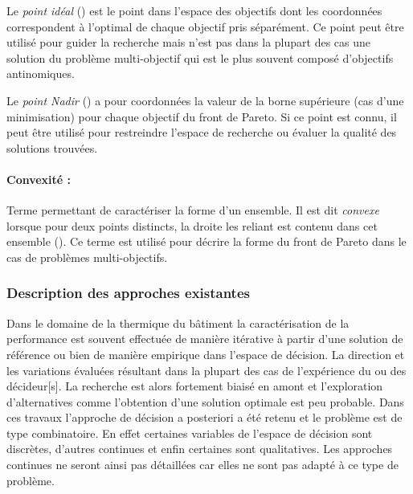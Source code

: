 Le \emph{point idéal} () est le point dans l’espace des objectifs dont
les coordonnées correspondent à l’optimal de chaque objectif pris séparément. Ce point
peut être utilisé pour guider la recherche mais n’est pas dans la plupart des cas
une solution du problème multi-objectif qui est le plus souvent composé d’objectifs
antinomiques.

Le \emph{point Nadir} () a pour coordonnées la
valeur de la borne supérieure (cas d’une minimisation) pour chaque objectif du front
de Pareto. Si ce point est connu, il peut être utilisé pour restreindre l’espace
de recherche ou évaluer la qualité des solutions trouvées.

\paragraph{Convexité :} %
\label{par:convexite}
Terme permettant de caractériser la forme d’un ensemble.
Il est dit \emph{convexe} lorsque pour deux points distincts, la droite les reliant
est contenu dans cet ensemble (\cite{Collette2002}). Ce terme est utilisé pour décrire
la forme du front de Pareto dans le cas de problèmes multi-objectifs.

\subsubsection{Description des approches existantes} %
\label{ssub:description_des_approches_existantes}
Dans le domaine de la thermique du bâtiment la caractérisation
de la performance est souvent effectuée de manière itérative à partir d’une solution
de référence ou bien de manière empirique dans l’espace de décision. La direction et
les variations évaluées résultant dans la plupart des cas de l’expérience du ou des
décideur[s]. La recherche est alors fortement biaisé en amont et l’exploration
d’alternatives comme l’obtention d’une solution optimale est peu probable.
Dans ces travaux l’approche de décision a posteriori a été retenu et le problème
est de type combinatoire. En effet certaines variables de l’espace de décision
sont discrètes, d’autres continues et enfin certaines sont qualitatives. Les approches
continues ne seront ainsi pas détaillées car elles ne sont pas adapté à ce type de
problème.

